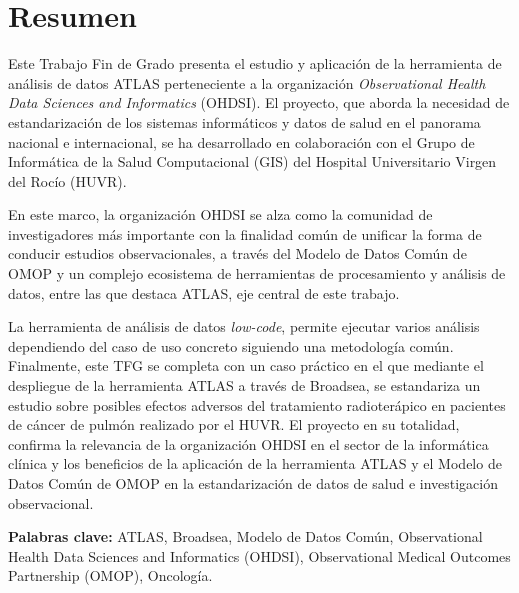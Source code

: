 \chapter*{Resumen}

Este Trabajo Fin de Grado presenta el estudio y aplicación de la herramienta de análisis de datos ATLAS perteneciente a la organización \textit{Observational Health Data Sciences and Informatics} (OHDSI). El proyecto, que aborda la necesidad de estandarización de los sistemas informáticos y datos de salud en el panorama nacional e internacional, se ha desarrollado en colaboración con el Grupo de Informática de la Salud Computacional (GIS) del Hospital Universitario Virgen del Rocío (HUVR).

En este marco, la organización OHDSI se alza como la comunidad de investigadores más importante con la finalidad común de unificar la forma de conducir estudios observacionales, a través del Modelo de Datos Común de OMOP y un complejo ecosistema de herramientas de procesamiento y análisis de datos, entre las que destaca ATLAS, eje central de este trabajo. 

La herramienta de análisis de datos \textit{low-code}, permite ejecutar varios análisis dependiendo del caso de uso concreto siguiendo una metodología común. Finalmente, este TFG se completa con un caso práctico en el que mediante el despliegue de la herramienta ATLAS a través de Broadsea, se estandariza un estudio sobre posibles efectos adversos del tratamiento radioterápico en pacientes de cáncer de pulmón realizado por el HUVR. El proyecto en su totalidad, confirma la relevancia de la organización OHDSI en el sector de la informática clínica y los beneficios de la aplicación de la herramienta ATLAS y el Modelo de Datos Común de OMOP en la estandarización de datos de salud e investigación observacional.


\vspace{.5cm}

\textbf{Palabras clave:} ATLAS, Broadsea, Modelo de Datos Común, Observational Health Data Sciences and Informatics (OHDSI), Observational Medical Outcomes Partnership (OMOP), Oncología.